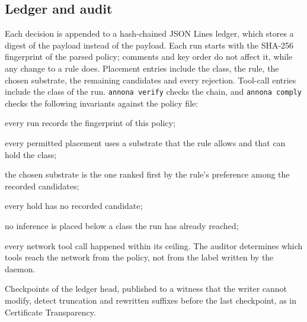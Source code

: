 \subsection{Ledger and audit}

Each decision is appended to a hash-chained JSON Lines ledger, which stores a digest of the
payload instead of the payload. Each run starts with the SHA-256 fingerprint of the parsed
policy; comments and key order do not affect it, while any change to a rule does. Placement
entries include the class, the rule, the chosen substrate, the remaining candidates and every
rejection. Tool-call entries include the class of the run. \texttt{annona verify} checks the
chain, and \texttt{annona comply} checks the following invariants against the policy file:

\begin{description}[leftmargin=2em, font=\normalfont\ttfamily]
  \item[bound] every run records the fingerprint of this policy;
  \item[sound] every permitted placement uses a substrate that the rule allows and that can hold the class;
  \item[optimal] the chosen substrate is the one ranked first by the rule's preference among the recorded candidates;
  \item[hold-justified] every hold has no recorded candidate;
  \item[monotone] no inference is placed below a class the run has already reached;
  \item[egress] every network tool call happened within its ceiling. The auditor determines
    which tools reach the network from the policy, not from the label written by the daemon.
\end{description}

Checkpoints of the ledger head, published to a witness that the writer cannot modify, detect
truncation and rewritten suffixes before the last checkpoint, as in Certificate Transparency.
